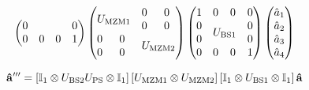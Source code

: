 \begin{equation}
\begin{split}
\begin{pmatrix}
			 0 & & & 0 \\
			 0 & 0 & 0 & 1
		\end{pmatrix}
		\begin{pmatrix}
			 \multicolumn{2}{c}{\multirow{2}{*}{$U_\text{MZM1}$}} & 0 & 0 \\
			 & & 0 & 0 \\
			 0 & 0 & \multicolumn{2}{c}{\multirow{2}{*}{$U_\text{MZM2}$}} \\
			 0 & 0 & & \\
		\end{pmatrix}
		\begin{pmatrix}
			 1 & 0 & 0 & 0 \\
			 0 & \multicolumn{2}{c}{\multirow{2}{*}{$U_\text{BS1}$}} & 0 \\
			 0 & & & 0 \\
			 0 & 0 & 0 & 1
		\end{pmatrix}
		\begin{pmatrix}
			\hat{a}_1 \\
			\hat{a}_2 \\
			\hat{a}_3 \\
			\hat{a}_4
		\end{pmatrix}
	\end{split}
\end{equation}

\begin{equation}
	\vb{\hat{a}}^{\prime\prime\prime}
	=
	\left[
		\mathbb{I}_1
		\otimes
		U_\text{BS2}
		U_\text{PS}
		\otimes
		\mathbb{I}_1
	\right]
	\left[
		U_\text{MZM1}
		\otimes
		U_\text{MZM2}
	\right]
	\left[
		\mathbb{I}_1
		\otimes
		U_\text{BS1}
		\otimes
		\mathbb{I}_1
	\right]
	\vb{\hat{a}}
\end{equation}